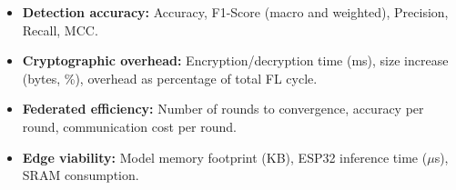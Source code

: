 \begin{itemize}
    \item \textbf{Detection accuracy:} Accuracy, F1-Score (macro and weighted), Precision, Recall, MCC.
    \item \textbf{Cryptographic overhead:} Encryption/decryption time (ms), size increase (bytes, \%), overhead as percentage of total FL cycle.
    \item \textbf{Federated efficiency:} Number of rounds to convergence, accuracy per round, communication cost per round.
    \item \textbf{Edge viability:} Model memory footprint (KB), ESP32 inference time ($\mu$s), SRAM consumption.
\end{itemize}
